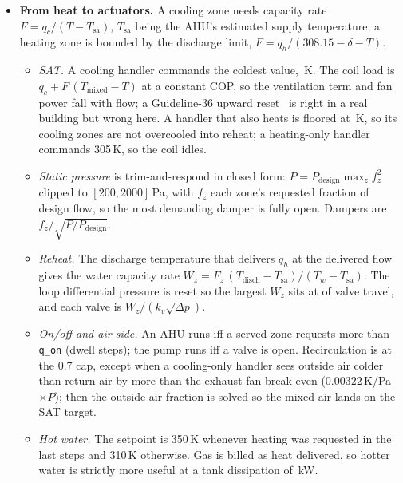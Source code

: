 \documentclass{article}
\begin{document}
\begin{itemize}
\begin{itemize}
  \item \emph{Setback bursts.} A running handler pays the ventilation load of every zone it serves. The floor (eco band widened by \ParNightLowExt{}/\ParNightHighExt\,K) is therefore held by requesting \ParQSbW\,W from any zone that crosses it until it is \ParSbHystK\,K inside, and the handler is off otherwise. Holding the floor with the PI loops instead kept a handler running for \VthreeAhuOnUnocc{} of the unoccupied steps on the coldest scenario.
  \end{itemize}
\item \textbf{From heat to actuators.} A cooling zone needs capacity rate $F = q_c/(T - T_{\text{sa}})$, $T_{\text{sa}}$ being the AHU's estimated supply temperature; a heating zone is bounded by the discharge limit, $F = q_h/(308.15 - \delta - T)$.
  \begin{itemize}
  \item \emph{SAT.} A cooling handler commands the coldest value, \ParSatCoolHi\,K. The coil load is $q_c + F\,(T_{\text{mixed}} - T)$ at a constant COP, so the ventilation term and fan power fall with flow; a Guideline-36 upward reset~\citep{ashrae2021g36,taylor2018vav} is right in a real building but wrong here. A handler that also heats is floored at \ParSatMixFloor\,K, so its cooling zones are not overcooled into reheat; a heating-only handler commands 305\,K, so the coil idles.
  \item \emph{Static pressure} is trim-and-respond in closed form: $P = P_{\text{design}}\max_z f_z^2$ clipped to $[200, 2000]$\,Pa, with $f_z$ each zone's requested fraction of design flow, so the most demanding damper is fully open. Dampers are $f_z/\sqrt{P/P_{\text{design}}}$.
  \item \emph{Reheat.} The discharge temperature that delivers $q_h$ at the delivered flow gives the water capacity rate $W_z = F_z\,(T_{\text{disch}} - T_{\text{sa}})/(T_w - T_{\text{sa}})$. The loop differential pressure is reset so the largest $W_z$ sits at \ParValveTarget{} of valve travel, and each valve is $W_z/(k_v \sqrt{\Delta p})$.
  \item \emph{On/off and air side.} An AHU runs iff a served zone requests more than \texttt{q\_on} (dwell \ParMinOnSteps{} steps); the pump runs iff a valve is open. Recirculation is at the 0.7 cap, except when a cooling-only handler sees outside air colder than return air by more than the exhaust-fan break-even ($0.00322$\,K/Pa$\times P$); then the outside-air fraction is solved so the mixed air lands on the SAT target.
  \item \emph{Hot water.} The setpoint is 350\,K whenever heating was requested in the last \ParHeatSeasonSteps{} steps and 310\,K otherwise. Gas is billed as heat delivered, so hotter water is strictly more useful at a tank dissipation of \TankLossExtraKw\,kW.

\end{itemize}
\end{itemize}
\end{document}
